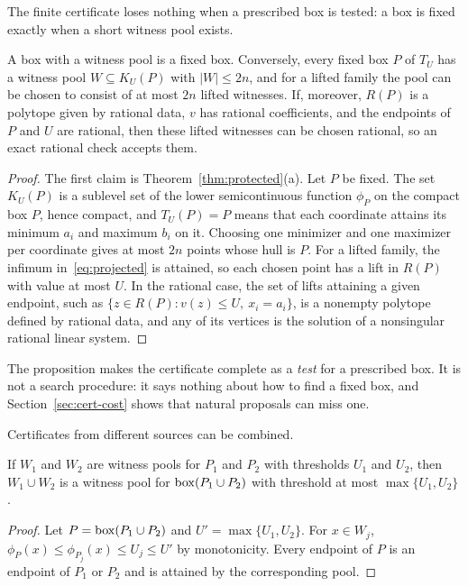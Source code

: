The finite certificate loses nothing when a prescribed box is tested: a
box is fixed exactly when a short witness pool exists.

\begin{proposition}\label{prop:fixed-box}
A box with a witness pool is a fixed box. Conversely, every fixed box $P$
of $T_U$ has a witness pool $W\subseteq K_U(P)$ with $|W|\le2n$, and for
a lifted family the pool can be chosen to consist of at most $2n$ lifted
witnesses. If, moreover, $R(P)$ is a polytope given by rational data, $v$
has rational coefficients, and the endpoints of $P$ and $U$ are rational,
then these lifted witnesses can be chosen rational, so an exact rational
check accepts them.
\end{proposition}
\begin{proof}
The first claim is Theorem~\ref{thm:protected}(a). Let $P$ be fixed. The
set $K_U(P)$ is a sublevel set of the lower semicontinuous function
$\phi_P$ on the compact box $P$, hence compact, and $T_U(P)=P$ means that
each coordinate attains its minimum $a_i$ and maximum $b_i$ on it.
Choosing one minimizer and one maximizer per coordinate gives at most $2n$
points whose hull is $P$. For a lifted family, the infimum
in~\eqref{eq:projected} is attained, so each chosen point has a lift in
$R(P)$ with value at most $U$. In the rational case, the set of lifts
attaining a given endpoint, such as $\{z\in R(P):v(z)\le U,\ x_i=a_i\}$,
is a nonempty polytope defined by rational data, and any of its vertices
is the solution of a nonsingular rational linear system.
\end{proof}

The proposition makes the certificate complete as a \emph{test} for a
prescribed box. It is not a search procedure: it says nothing about how
to find a fixed box, and Section~\ref{sec:cert-cost} shows that natural
proposals can miss one.

Certificates from different sources can be combined.

\begin{proposition}\label{prop:join}
If $W_1$ and $W_2$ are witness pools for $P_1$ and $P_2$ with thresholds
$U_1$ and $U_2$, then $W_1\cup W_2$ is a witness pool for
$\operatorname{box}(P_1\cup P_2)$ with threshold at most $\max\{U_1,U_2\}$.
\end{proposition}
\begin{proof}
Let $P=\operatorname{box}(P_1\cup P_2)$ and $U'=\max\{U_1,U_2\}$. For $x\in W_j$,
$\phi_P(x)\le\phi_{P_j}(x)\le U_j\le U'$ by monotonicity. Every endpoint
of $P$ is an endpoint of $P_1$ or $P_2$ and is attained by the
corresponding pool.
\end{proof}

